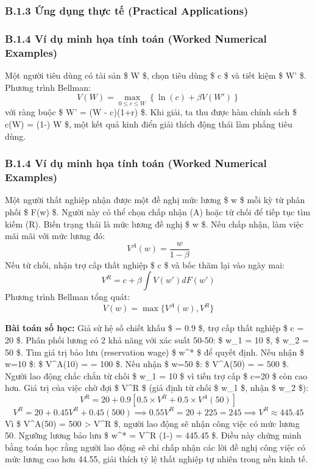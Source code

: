\documentclass[
]{article}
\begin{document}
\subsubsection{B.1.3 Ứng dụng thực tế (Practical
Applications)}\label{b.1.3-ux1ee9ng-dux1ee5ng-thux1ef1c-tux1ebf-practical-applications}

\subsubsection{B.1.4 Ví dụ minh họa tính toán (Worked Numerical
Examples)}\label{b.1.4-vuxed-dux1ee5-minh-hux1ecda-tuxednh-touxe1n-worked-numerical-examples}

Một người tiêu dùng có tài sản \$ W \$, chọn tiêu dùng \$ c \$ và tiết
kiệm \$ W' \$. Phương trình Bellman:
\[ V(W) = \max_{0 \le c \le W} \left\{ \ln(c) + \beta V(W') \right\} \]
với ràng buộc \$ W' = (W - c)(1+r) \$. Khi giải, ta thu được hàm chính
sách \$ c(W) = (1-\beta) W \$, một kết quả kinh điển giải thích động
thái làm phẳng tiêu dùng.

\subsubsection{B.1.4 Ví dụ minh họa tính toán (Worked Numerical
Examples)}\label{b.1.4-vuxed-dux1ee5-minh-hux1ecda-tuxednh-touxe1n-worked-numerical-examples-1}

Một người thất nghiệp nhận được một đề nghị mức lương \$ w \$ mỗi kỳ từ
phân phối \$ F(w) \$. Người này có thể chọn chấp nhận (A) hoặc từ chối
để tiếp tục tìm kiếm (R). Biến trạng thái là mức lương đề nghị \$ w \$.
Nếu chấp nhận, làm việc mãi mãi với mức lương đó:
\[ V^A(w) = \frac{w}{1-\beta} \] Nếu từ chối, nhận trợ cấp thất nghiệp
\$ c \$ và bốc thăm lại vào ngày mai:
\[ V^R = c + \beta \int V(w') dF(w') \] Phương trình Bellman tổng quát:
\[ V(w) = \max \{ V^A(w), V^R \} \]

\textbf{Bài toán số học:} Giả sử hệ số chiết khấu \$ \beta = 0.9 \$, trợ
cấp thất nghiệp \$ c = 20 \$. Phân phối lương có 2 khả năng với xác suất
50-50: \$ w\_1 = 10 \$, \$ w\_2 = 50 \$. Tìm giá trị bảo lưu
(reservation wage) \$ w\^{}* \$ để quyết định. Nếu nhận \$ w=10 \$: \$
V\^{}A(10) =  = 100 \$. Nếu nhận \$ w=50 \$: \$
V\^{}A(50) =  = 500 \$. Người lao động chắc chắn từ
chối \$ w\_1 = 10 \$ vì tiền trợ cấp \$ c=20 \$ còn cao hơn. Giá trị của
việc chờ đợi \$ V\^{}R \$ (giả định từ chối \$ w\_1 \$, nhận \$ w\_2
\$):
\[ V^R = 20 + 0.9 \left[ 0.5 \times V^R + 0.5 \times V^A(50) \right] \]
\[ V^R = 20 + 0.45 V^R + 0.45(500) \implies 0.55 V^R = 20 + 225 = 245 \implies V^R \approx 445.45 \]
Vì \$ V\^{}A(50) = 500 \textgreater{} V\^{}R \$, người lao động sẽ nhận
công việc có mức lương 50. Ngưỡng lương bảo lưu \$ w\^{}* = V\^{}R
(1-\beta) = 445.45   \$. Điều này chứng minh bằng
toán học rằng người lao động sẽ chỉ chấp nhận các lời đề nghị công việc
có mức lương cao hơn 44.55, giải thích tỷ lệ thất nghiệp tự nhiên trong
nền kinh tế.
\end{document}
